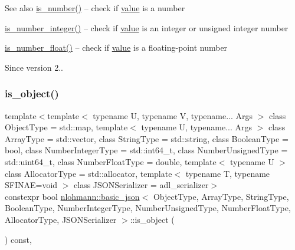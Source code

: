 \begin{DoxySeeAlso}{See also}
\mbox{\hyperlink{classnlohmann_1_1basic__json_a2b9852390abb4b1ef5fac6984e2fc0f3}{is\+\_\+number()}} -- check if \mbox{\hyperlink{classnlohmann_1_1basic__json_af9c51328fbe1da75eca750be3009917a}{value}} is a number 

\mbox{\hyperlink{classnlohmann_1_1basic__json_abac8af76067f1e8fdca9052882c74428}{is\+\_\+number\+\_\+integer()}} -- check if \mbox{\hyperlink{classnlohmann_1_1basic__json_af9c51328fbe1da75eca750be3009917a}{value}} is an integer or unsigned integer number 

\mbox{\hyperlink{classnlohmann_1_1basic__json_a33b4bf898b857c962e798fc7f6e86e70}{is\+\_\+number\+\_\+float()}} -- check if \mbox{\hyperlink{classnlohmann_1_1basic__json_af9c51328fbe1da75eca750be3009917a}{value}} is a floating-\/point number
\end{DoxySeeAlso}
\begin{DoxySince}{Since}
version 2.. 
\end{DoxySince}
\mbox{\label{classnlohmann_1_1basic__json_af8f511af124e82e4579f444b4175787c}} 
\subsubsection{\texorpdfstring{is\_object()}{is\_object()}}
{\footnotesize\ttfamily template$<$template$<$ typename U, typename V, typename... Args $>$ class Object\+Type = std\+::map, template$<$ typename U, typename... Args $>$ class Array\+Type = std\+::vector, class String\+Type  = std\+::string, class Boolean\+Type  = bool, class Number\+Integer\+Type  = std\+::int64\+\_\+t, class Number\+Unsigned\+Type  = std\+::uint64\+\_\+t, class Number\+Float\+Type  = double, template$<$ typename U $>$ class Allocator\+Type = std\+::allocator, template$<$ typename T, typename S\+F\+I\+N\+A\+E=void $>$ class J\+S\+O\+N\+Serializer = adl\+\_\+serializer$>$ \\
constexpr bool \mbox{\hyperlink{classnlohmann_1_1basic__json}{nlohmann\+::basic\+\_\+json}}$<$ Object\+Type, Array\+Type, String\+Type, Boolean\+Type, Number\+Integer\+Type, Number\+Unsigned\+Type, Number\+Float\+Type, Allocator\+Type, J\+S\+O\+N\+Serializer $>$\+::is\+\_\+object (\begin{DoxyParamCaption}{ }\end{DoxyParamCaption}) const\hspace{0.3cm}{\ttfamily [inline]}, {\ttfamily [noexcept]}}



